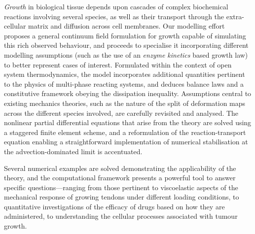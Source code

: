 \documentclass[leqno,final]{report}
\begin{document}
{\em Growth} in biological tissue depends upon cascades of complex
biochemical reactions involving several species, as well as their
transport through the extra-cellular matrix and diffusion across cell
membranes. Our modelling effort proposes a general continuum field
formulation for growth capable of simulating this rich observed
behaviour, and proceeds to specialise it incorporating different
modelling assumptions (such as the use of an {\sl enzyme kinetics}
based growth law) to better represent cases of interest. Formulated
within the context of open system thermodynamics, the model
incorporates additional quantities pertinent to the physics of
multi-phase reacting systems, and deduces balance laws and a
constitutive framework obeying the dissipation inequality. Assumptions
central to existing mechanics theories, such as the nature of the
split of deformation maps across the different species involved, are
carefully revisited and analysed. The nonlinear partial differential
equations that arise from the theory are solved using a staggered
finite element scheme, and a reformulation of the reaction-transport
equation enabling a straightforward implementation of numerical
stabilisation at the advection-dominated limit is accentuated.

Several numerical examples are solved demonstrating the applicability
of the theory, and the computational framework presents a powerful
tool to answer specific questions---ranging from those pertinent to
viscoelastic aspects of the mechanical response of growing tendons
under different loading conditions, to quantitative investigations of
the efficacy of drugs based on how they are administered, to
understanding the cellular processes associated with tumour growth.

\thispagestyle{empty}
\end{document}
